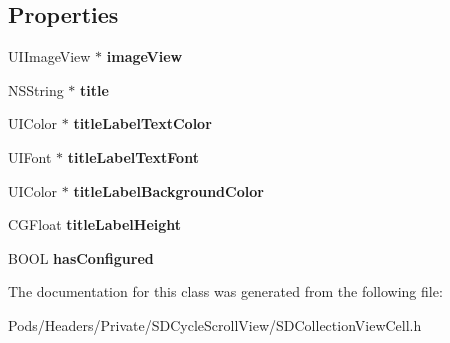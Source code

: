\subsection*{Properties}
\begin{DoxyCompactItemize}
\item 
\mbox{\label{interface_s_d_collection_view_cell_a260607bde94ef5fe8fa3dce51a789302}} 
U\+I\+Image\+View $\ast$ {\bfseries image\+View}
\item 
\mbox{\label{interface_s_d_collection_view_cell_af869b5f0692146674cd57f0919b62ba5}} 
N\+S\+String $\ast$ {\bfseries title}
\item 
\mbox{\label{interface_s_d_collection_view_cell_a3b45453acfff7225f3b774d0f8a4eba2}} 
U\+I\+Color $\ast$ {\bfseries title\+Label\+Text\+Color}
\item 
\mbox{\label{interface_s_d_collection_view_cell_a53e31ca95677d060ef5d0ade9a0b942d}} 
U\+I\+Font $\ast$ {\bfseries title\+Label\+Text\+Font}
\item 
\mbox{\label{interface_s_d_collection_view_cell_afb6bcbbc7a95286b68747b97f99c30c1}} 
U\+I\+Color $\ast$ {\bfseries title\+Label\+Background\+Color}
\item 
\mbox{\label{interface_s_d_collection_view_cell_a12b58f4777f9f096f93aea39aa46faa0}} 
C\+G\+Float {\bfseries title\+Label\+Height}
\item 
\mbox{\label{interface_s_d_collection_view_cell_aba008b962f145afafc5e393f2d182309}} 
B\+O\+OL {\bfseries has\+Configured}
\end{DoxyCompactItemize}


The documentation for this class was generated from the following file\+:\begin{DoxyCompactItemize}
\item 
Pods/\+Headers/\+Private/\+S\+D\+Cycle\+Scroll\+View/S\+D\+Collection\+View\+Cell.\+h\end{DoxyCompactItemize}
